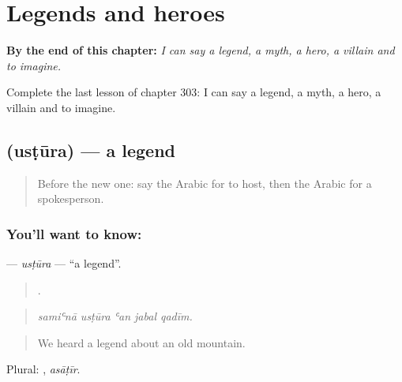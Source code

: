 
\chapter{Legends and heroes}
\label{ch:ar-legends-and-heroes}

\begin{chapteropening}
\textbf{By the end of this chapter:} \emph{I can say a legend, a myth, a hero, a villain and to imagine.}

Complete the last lesson of chapter 303: I can say a legend, a myth, a hero, a villain and to imagine.
\end{chapteropening}

\section[\texorpdfstring{\ar{أسطورة} (usṭūra)}{أسطورة (usṭūra)}]{ (usṭūra) — a legend}

\label{lesson:AR-C303-ustura}



\begin{quote}
Before the new one: say the Arabic for to host, then the Arabic for a spokesperson.
\end{quote}

\subsection*{You'll want to know: }
\textbf{} — \emph{usṭūra} — \textquotedblleft{}a legend\textquotedblright{}.

\begin{quote}
    .
\end{quote}

\begin{quote}
\emph{samiʿnā usṭūra ʿan jabal qadīm.}
\end{quote}

\begin{quote}
We heard a legend about an old mountain.
\end{quote}

Plural: , \emph{asāṭīr}.

